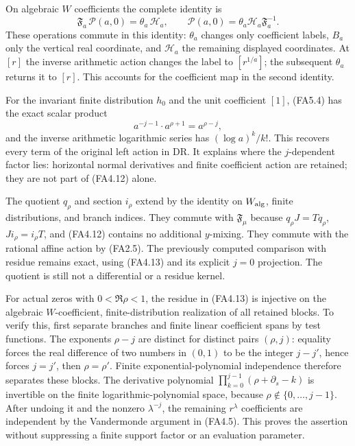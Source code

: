 On algebraic \(W\) coefficients the complete identity is \[
 \boxed{\mathfrak F_a\,\mathcal P(a,0)
       =\theta_a\,\mathcal H_a,\qquad
       \mathcal P(a,0)=
           \theta_a\mathcal H_a\mathfrak F_a^{-1}.}
\tag{FA5.4}
\] These operations commute in this identity: \(\theta_a\) changes only
coefficient labels, \(B_a\) only the vertical real coordinate, and
\(\mathcal H_a\) the remaining displayed coordinates. At \([r]\) the
inverse arithmetic action changes the label to \([r^{1/a}]\); the
subsequent \(\theta_a\) returns it to \([r]\). This accounts for the
coefficient map in the second identity.

For the invariant finite distribution \(h_0\) and the unit coefficient
\([1]\), (FA5.4) has the exact scalar product \[
 a^{-j-1}\cdot a^{\rho+1}=a^{\rho-j},
\tag{FA5.5}
\] and the inverse arithmetic logarithmic series has \((\log a)^k/k!\).
This recovers every term of the original left action in DR. It explains
where the \(j\)-dependent factor lies: horizontal normal derivatives and
finite coefficient action are retained; they are not part of (FA4.12)
alone.

The quotient \(q_\rho\) and section \(i_\rho\) extend by the identity on
\(W_{\rm alg}\), finite distributions, and branch indices. They commute
with \(\mathfrak F_\mu\) because \(q_\rho J=Tq_\rho\),
\(Ji_\rho=i_\rho T\), and (FA4.12) contains no additional \(y\)-mixing.
They commute with the rational affine action by (FA2.5). The previously
computed comparison with residue remains exact, using (FA4.13) and its
explicit \(j=0\) projection. The quotient is still not a differential or
a residue kernel.

For actual zeros with \(0<\Re\rho<1\), the residue in (FA4.13) is
injective on the algebraic \(W\)-coefficient, finite-distribution
realization of all retained blocks. To verify this, first separate
branches and finite linear coefficient spans by test functions. The
exponents \(\rho-j\) are distinct for distinct pairs \((\rho,j)\):
equality forces the real difference of two numbers in \((0,1)\) to be
the integer \(j-j'\), hence forces \(j=j'\), then \(\rho=\rho'\). Finite
exponential-polynomial independence therefore separates these blocks.
The derivative polynomial \(\prod_{k=0}^{j-1}(\rho+\partial_s-k)\) is
invertible on the finite logarithmic-polynomial space, because
\(\rho\notin\{0,\ldots,j-1\}\). After undoing it and the nonzero
\(\lambda^{-j}\), the remaining \(r^\lambda\) coefficients are
independent by the Vandermonde argument in (FA4.5). This proves the
assertion without suppressing a finite support factor or an evaluation
parameter.

